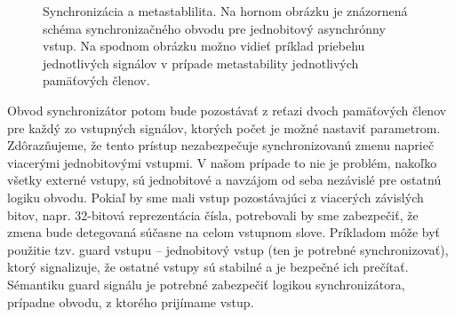 \begin{figure}
    \centering
    \vfill
    \caption[Synchronizácia a metastablilita]{Synchronizácia a metastablilita. Na hornom obrázku je znázornená schéma synchronizačného obvodu pre jednobitový asynchrónny vstup. Na spodnom obrázku možno vidieť príklad priebehu jednotlivých signálov v prípade metastability jednotlivých pamäťových členov.}
    \label{obr:synchronizer}
\end{figure}

Obvod synchronizátor potom bude pozostávať z reťazi dvoch pamäťových členov pre každý zo vstupných signálov, ktorých počet je možné nastaviť parametrom. Zdôrazňujeme, že tento prístup nezabezpečuje synchronizovanú zmenu naprieč viacerými jednobitovými vstupmi. V našom prípade to nie je problém, nakoľko všetky externé vstupy, sú jednobitové a navzájom od seba nezávislé pre ostatnú logiku obvodu. Pokiaľ by sme mali vstup pozostávajúci z viacerých závislých bitov, napr. 32-bitová reprezentácia čísla, potrebovali by sme zabezpečiť, že zmena bude detegovaná súčasne na celom vstupnom slove. Príkladom môže byť použitie tzv. guard vstupu -- jednobitový vstup (ten je potrebné synchronizovať), ktorý signalizuje, že ostatné vstupy sú stabilné a je bezpečné ich prečítať. Sémantiku guard signálu je potrebné zabezpečiť logikou synchronizátora, prípadne obvodu, z ktorého prijímame vstup.


